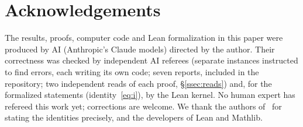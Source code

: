 \documentclass[11pt]{amsart}
\theoremstyle{definition}
\numberwithin{equation}{section}
\begin{document}
\section*{Acknowledgements}
The results, proofs, computer code and Lean formalization in this paper were produced by AI (Anthropic's
Claude models) directed by the author. Their correctness was checked by independent AI referees
(separate instances instructed to find errors, each writing its own code; seven reports, included in
the repository; two independent reads of each proof, §\ref{ssec:reads}) and, for the formalized statements
(identity~\eqref{eq:i}), by the Lean kernel. No human expert has refereed
this work yet; corrections are welcome. We thank the authors of~\cite{KRTW} for stating the identities
precisely, and the developers of Lean and Mathlib.
\end{document}
